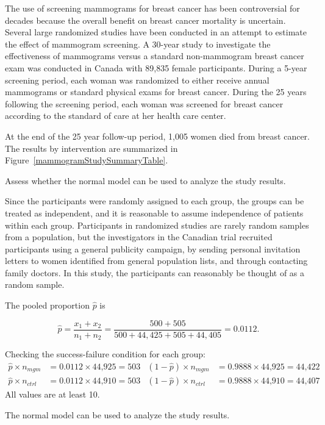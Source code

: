 \begin{examplewrap}
\begin{nexample}{The use of screening mammograms for breast cancer has been controversial for decades because the overall benefit on breast cancer mortality is uncertain.  Several large randomized studies have been conducted in an attempt to estimate the effect of mammogram screening. A 30-year study to investigate the effectiveness of mammograms versus a standard non-mammogram breast cancer exam was conducted in Canada with 89,835 female participants.\footnotemark{} During a 5-year screening period, each woman was randomized to either receive annual mammograms or standard physical exams for breast cancer.  During the 25 years following the screening period, each woman was screened for breast cancer according to the standard of care at her health care center. \vspace{3mm}

At the end of the 25 year follow-up period, 1,005 women died from breast cancer. The results by intervention are summarized in Figure~\ref{mammogramStudySummaryTable}. \vspace{3mm}

Assess whether the normal model can be used to analyze the study results.}\label{mammogramSuccessFailure}%

Since the participants were randomly assigned to each group, the groups can be treated as independent, and it is reasonable to assume independence of patients within each group.  Participants in randomized studies are rarely random samples from a population, but the investigators in the Canadian trial recruited  participants using a general publicity campaign, by sending personal invitation letters to women identified from general population lists, and through contacting family doctors.  In this study, the participants can reasonably be thought of as a random sample.

The pooled proportion $\hat{p}$ is

\[\hat{p} = \dfrac{x_{1} + x_{2}}{n_{1} + n_{2}} = \dfrac{500 + 505}{500 + 44,425 + 505 + 44,405} = 0.0112. \]

Checking the success-failure condition for each group:
\begin{align*}
\hat{p} \times n_{mgm} &= 0.0112 \times \text{44,925} = 503
& (1 - \hat{p}) \times n_{mgm} &= 0.9888 \times \text{44,925} = \text{44,422} \\
\hat{p} \times n_{ctrl} &= 0.0112 \times \text{44,910} = 503
& (1 - \hat{p}) \times n_{ctrl} &= 0.9888 \times \text{44,910} = \text{44,407}
\end{align*}
All values are at least 10.

The normal model can be used to analyze the study results.
\end{nexample}
\end{examplewrap}


